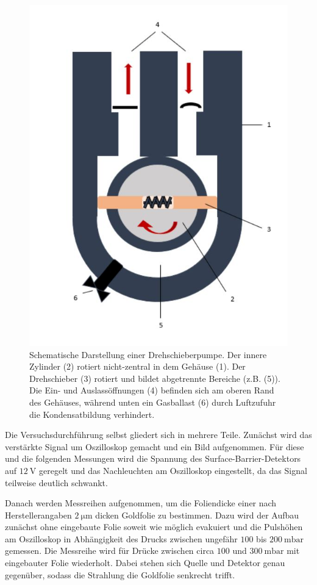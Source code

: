 \begin{figure}
  \centering
  \includegraphics[height=0.35\textheight]{images/pumpe.jpg}
  \caption{Schematische Darstellung einer Drehschieberpumpe. Der innere Zylinder (2) rotiert nicht-zentral in dem Gehäuse (1). Der Drehschieber (3) rotiert und bildet abgetrennte Bereiche (z.B. (5)). Die Ein- und Auslassöffnungen (4) befinden sich am oberen Rand des Gehäuses, während unten ein Gasballast (6) durch Luftzufuhr die Kondensatbildung verhindert. \cite{pumpe}}
  \label{fig:pumpe}
\end{figure}

Die Versuchsdurchführung selbst gliedert sich in mehrere Teile.
Zunächst wird das verstärkte Signal um Oszilloskop gemacht und ein Bild aufgenommen. Für diese und die folgenden Messungen wird die Spannung des Surface-Barrier-Detektors auf $\SI{12}{\volt}$ geregelt und das Nachleuchten am Oszilloskop eingestellt, da das Signal teilweise deutlich schwankt.

Danach werden Messreihen aufgenommen, um die Foliendicke einer nach Herstellerangaben $\SI{2}{\micro\meter}$ dicken Goldfolie zu bestimmen. Dazu wird der Aufbau zunächst ohne eingebaute Folie soweit wie möglich evakuiert und die Pulshöhen am Oszilloskop in Abhängigkeit des Drucks zwischen ungefähr $100$ bis $\SI{200}{\milli\bar}$ gemessen. Die Messreihe wird für Drücke zwischen circa $100$ und $\SI{300}{\milli\bar}$ mit eingebauter Folie wiederholt. Dabei stehen sich Quelle und Detektor genau gegenüber, sodass die Strahlung die Goldfolie senkrecht trifft.

